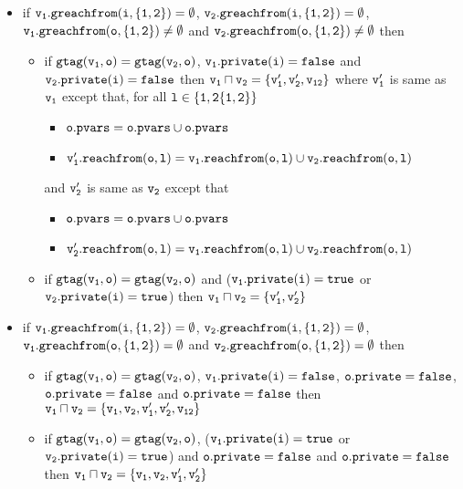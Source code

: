 \begin{itemize}
 \item if $\tt \frag_1.greachfrom(i,\{1,2\}) = \emptyset$, $\tt \frag_2.greachfrom(i,\{1,2\}) = \emptyset$, $\tt \frag_1.greachfrom(o,\{1,2\}) \neq \emptyset$ and $\tt \frag_2.greachfrom(o,\{1,2\}) \neq \emptyset$ then 
  \begin{itemize}
  \item if $\tt gtag(\frag_1, o) = gtag(\frag_2, o)$, $\tt \frag_1.private(i) = \false$ and $\tt \frag_2.private(i) = \false$ then $\tt \frag_1 \sqcap \frag_2 = \{\frag_1', \frag_2', \frag_{12}\}$ where %
  $\tt \frag_1'$ is same as $\tt \frag_1$ except that, for all $\tt l \in \{1,2 \{1,2\}\}$
    \begin{itemize}
  \item  $\tt \pvarsat{\outat{\frag_1'}} = \pvarsat{\outat{\frag_1}} \cup \pvarsat{\outat{\frag_2}}$
  \item $\tt \frag_1'.reachfrom(o,l) = \frag_{1}.reachfrom(o,l) \cup \frag_{2}.reachfrom(o,l)$
    \end{itemize}
   and $\tt \frag_2'$ is same as $\tt \frag_2$ except that 
    \begin{itemize}
  \item  $\tt \pvarsat{\outat{\frag_2'}} = \pvarsat{\outat{\frag_1}} \cup \pvarsat{\outat{\frag_2}}$
  \item $\tt \frag_2'.reachfrom(o,l) = \frag_{1}.reachfrom(o,l) \cup \frag_{2}.reachfrom(o,l)$
    \end{itemize}
     \item if $\tt gtag(\frag_1, o) = gtag(\frag_2, o)$ and ($\tt \frag_1.private(i) = \true$ or $\tt \frag_2.private(i) = \true$) then $\tt \frag_1 \sqcap \frag_2 = \{\frag_1', \frag_2'\}$ 
 \end{itemize}
 
 
  \item if $\tt \frag_1.greachfrom(i,\{1,2\}) = \emptyset$, $\tt \frag_2.greachfrom(i,\{1,2\}) = \emptyset$, $\tt \frag_1.greachfrom(o,\{1,2\}) = \emptyset$ and $\tt \frag_2.greachfrom(o,\{1,2\}) = \emptyset$ then 
 \begin{itemize}
 
 
 \item if $\tt gtag(\frag_1, o) = gtag(\frag_2, o)$, $\tt \frag_1.private(i) = \false$, $\tt \privateat{\outat{\frag_1}} = \false$, $\tt \privateat{\outat{\frag_1}} = \false$ and $\tt \privateat{\outat{\frag_2}} = \false$ then  $\tt \frag_1 \sqcap \frag_2 = \{\frag_1,\frag_2,\frag_1',\frag_2',\frag_{12}\}$ %
    \item if $\tt gtag(\frag_1, o) = gtag(\frag_2, o)$, ($\tt \frag_1.private(i) = true$ or $\tt \frag_2.private(i) = true$) and $\tt \privateat{\outat{\frag_1}} = \false$ and $\tt \privateat{\outat{\frag_2}} = \false$ then  $\tt \frag_1 \sqcap \frag_2 = \{\frag_1,\frag_2,\frag_1',\frag_2'\}$  


\end{itemize}
\end{itemize}
